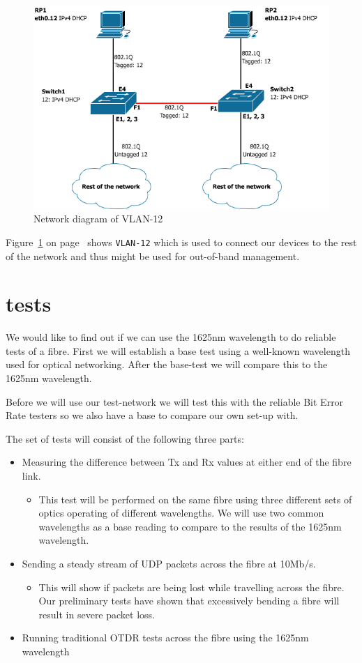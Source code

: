 \documentclass{article}
\begin{document}
\begin{figure}[h]
\centerline{\includegraphics[scale=0.4, trim = 0mm 0mm 0mm 0mm]{images/PoC_12.png}}
\caption{Network diagram of VLAN-12}
\label{fig:poc_12}
\end{figure}
Figure~\ref{fig:poc_12} on page~\pageref{fig:poc_12} shows \texttt{VLAN-12} which is used to connect our devices to the rest of the network and thus might be used for out-of-band management.

\newpage
\section{tests}
We would like to find out if we can use the 1625nm wavelength to do reliable tests of a fibre. First we will establish a base test using a well-known wavelength used for optical networking. After the base-test we will compare this to the 1625nm wavelength.

Before we will use our test-network we will test this with the reliable Bit Error Rate testers so we also have a base to compare our own set-up with.

The set of tests will consist of the following three parts:
\begin{itemize}
\item Measuring the difference between Tx and Rx values at either end of the fibre link.
	\begin{itemize}
	\item This test will be performed on the same fibre using three different sets of optics operating of different wavelengths.  We will use two common wavelengths as a base reading to compare to the results of the 1625nm wavelength.
	\end{itemize}
\item Sending a steady stream of UDP packets across the fibre at 10Mb/s.
	\begin{itemize}
	\item This will show if packets are being lost while travelling across the fibre. Our preliminary tests have shown that excessively bending a fibre will result in severe packet loss.
	\end{itemize}
\item Running traditional OTDR tests across the fibre using the 1625nm wavelength
\end{itemize}
\end{document}
